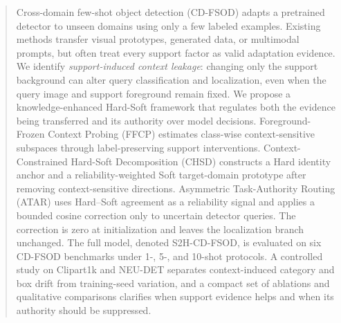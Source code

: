 \begin{abstract}
Cross-domain few-shot object detection (CD-FSOD) adapts a pretrained detector to unseen domains using only a few labeled examples. Existing methods transfer visual prototypes, generated data, or multimodal prompts, but often treat every support factor as valid adaptation evidence. We identify \emph{support-induced context leakage}: changing only the support background can alter query classification and localization, even when the query image and support foreground remain fixed. We propose a knowledge-enhanced Hard-Soft framework that regulates both the evidence being transferred and its authority over model decisions. Foreground-Frozen Context Probing (FFCP) estimates class-wise context-sensitive subspaces through label-preserving support interventions. Context-Constrained Hard-Soft Decomposition (CHSD) constructs a Hard identity anchor and a reliability-weighted Soft target-domain prototype after removing context-sensitive directions. Asymmetric Task-Authority Routing (ATAR) uses Hard--Soft agreement as a reliability signal and applies a bounded cosine correction only to uncertain detector queries. The correction is zero at initialization and leaves the localization branch unchanged. The full model, denoted S2H-CD-FSOD, is evaluated on six CD-FSOD benchmarks under 1-, 5-, and 10-shot protocols. A controlled study on Clipart1k and NEU-DET separates context-induced category and box drift from training-seed variation, and a compact set of ablations and qualitative comparisons clarifies when support evidence helps and when its authority should be suppressed.
\end{abstract}
